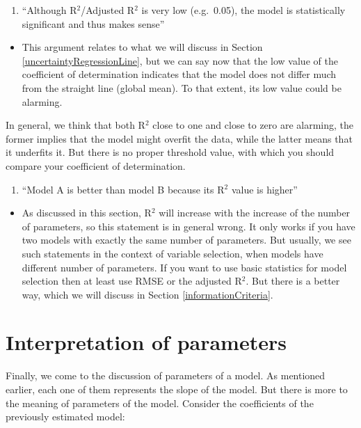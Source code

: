 \documentclass[
]{book}
\providecommand{\tightlist}{%
  \setlength{\itemsep}{0pt}\setlength{\parskip}{0pt}}
\theoremstyle{definition}
\theoremstyle{definition}
\theoremstyle{definition}
\theoremstyle{definition}
\theoremstyle{remark}
\begin{document}
\begin{enumerate}
\def\labelenumi{\arabic{enumi}.}
\setcounter{enumi}{1}
\tightlist
\item
  ``Although R\(^2\)/Adjusted R\(^2\) is very low (e.g.~0.05), the model is statistically significant and thus makes sense''
\end{enumerate}

\begin{itemize}
\tightlist
\item
  This argument relates to what we will discuss in Section \ref{uncertaintyRegressionLine}, but we can say now that the low value of the coefficient of determination indicates that the model does not differ much from the straight line (global mean). To that extent, its low value could be alarming.
\end{itemize}

In general, we think that both R\(^2\) close to one and close to zero are alarming, the former implies that the model might overfit the data, while the latter means that it underfits it. But there is no proper threshold value, with which you should compare your coefficient of determination.

\begin{enumerate}
\def\labelenumi{\arabic{enumi}.}
\setcounter{enumi}{2}
\tightlist
\item
  ``Model A is better than model B because its R\(^2\) value is higher''
\end{enumerate}

\begin{itemize}
\tightlist
\item
  As discussed in this section, R\(^2\) will increase with the increase of the number of parameters, so this statement is in general wrong. It only works if you have two models with exactly the same number of parameters. But usually, we see such statements in the context of variable selection, when models have different number of parameters. If you want to use basic statistics for model selection then at least use RMSE or the adjusted R\(^2\). But there is a better way, which we will discuss in Section \ref{informationCriteria}.
\end{itemize}

\section{Interpretation of parameters}\label{interpretation-of-parameters}

Finally, we come to the discussion of parameters of a model. As mentioned earlier, each one of them represents the slope of the model. But there is more to the meaning of parameters of the model. Consider the coefficients of the previously estimated model:
\end{document}
